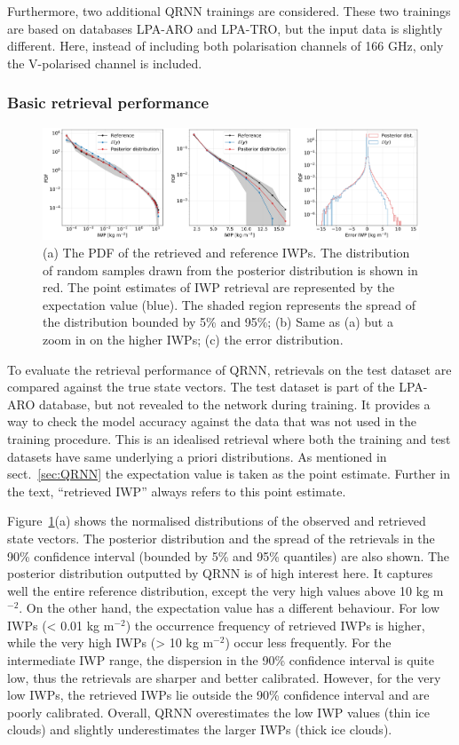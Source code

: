 \documentclass[amt, manuscript]{copernicus}
\begin{document}
Furthermore, two additional QRNN trainings are considered. These two trainings are based on databases LPA-ARO and LPA-TRO, but the input data is slightly different. Here, instead of including both polarisation channels of 166\,\,GHz, only the V-polarised channel is included.

\subsubsection{Basic retrieval performance}
%
\label{sec:basic_performance}

\begin{figure}[t]
	\includegraphics[width=12cm]{Figures/PDF_IWP_ARO.pdf}
	\caption{(a) The PDF of the retrieved and reference IWPs. The distribution of random samples drawn from the posterior distribution is shown in red. The point estimates of IWP retrieval are represented by the expectation value (blue). The shaded region represents the spread of the distribution bounded by 5\% and 95\%; (b) Same as (a) but a zoom in on the higher IWPs; (c) the error distribution. }
	\label{fig:PDF_IWP_test}
\end{figure}

To evaluate the  retrieval performance of QRNN, retrievals on the test dataset are compared against the true state vectors. The test dataset is part of the LPA-ARO database, but not revealed to the network during training. It provides a way to check the model accuracy against the data that was not used in the training procedure. This is an idealised retrieval where both the training and test datasets have same underlying a priori distributions. As mentioned in sect.~\ref{sec:QRNN} the expectation value is taken as the point estimate. Further in the text, ``retrieved IWP'' always refers to this point estimate.

Figure~\ref{fig:PDF_IWP_test}(a) shows the normalised distributions of the observed and retrieved state vectors. The posterior distribution and the spread of the retrievals in the 90\% confidence interval (bounded by 5\% and 95\% quantiles) are also shown. The posterior distribution outputted by QRNN is of high interest here. It captures well the entire reference distribution, except the very high values above 10\,\,kg m$^{-2}$.  On the other hand, the expectation value has a different behaviour. For low IWPs (< 0.01\,\,kg m$^{-2}$) the occurrence frequency of retrieved IWPs is higher, while the very high IWPs (> 10\,\,kg m$^{-2}$) occur less frequently. For the intermediate IWP range, the dispersion in the 90\% confidence interval is quite low, thus the retrievals are  sharper and better calibrated. However, for the very low IWPs, the retrieved IWPs lie outside the 90\% confidence interval and are poorly calibrated. Overall, QRNN overestimates the low IWP values (thin ice clouds) and  slightly underestimates the larger IWPs (thick ice clouds).
\end{document}

